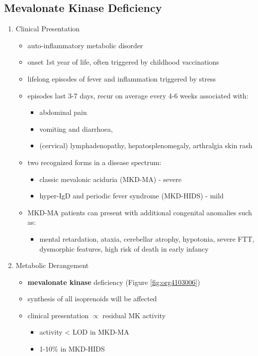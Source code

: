 \documentclass{scrartcl}
\begin{document}
\subsection{Mevalonate Kinase Deficiency}
\label{sec:orgbe922b3}
\begin{enumerate}
\item Clinical Presentation
\label{sec:orgbd4abcf}
\begin{itemize}
\item auto-inflammatory metabolic disorder
\item onset 1st year of life, often triggered by childhood vaccinations
\item lifelong episodes of fever and inflammation triggered by stress
\item episodes last 3-7 days, recur on average every 4-6 weeks associated with:
\begin{itemize}
\item abdominal pain
\item vomiting and diarrhoea,
\item (cervical) lymphadenopathy, hepatosplenomegaly, arthralgia skin rash
\end{itemize}
\item two recognized forms in a disease spectrum:
\begin{itemize}
\item classic mevalonic aciduria (MKD-MA) - severe
\item hyper-IgD and periodic fever syndrome (MKD-HIDS) - mild
\end{itemize}

\item MKD-MA patients can present with additional congenital anomalies
such as:
\begin{itemize}
\item mental retardation, ataxia, cerebellar atrophy, hypotonia, severe
FTT, dysmorphic features, high risk of death in early infancy
\end{itemize}
\end{itemize}

\item Metabolic Derangement
\label{sec:orgd3fe366}
\begin{itemize}
\item \textbf{mevalonate kinase} deficiency (Figure \ref{fig:org4103006})
\end{itemize}
\begin{itemize}
\item synthesis of all isoprenoids will be affected
\item clinical presentation \(\propto\) residual MK activity
\begin{itemize}
\item activity < LOD in MKD-MA
\item 1-10\% in MKD-HIDS
\end{itemize}
\end{itemize}


\end{enumerate}
\end{document}

